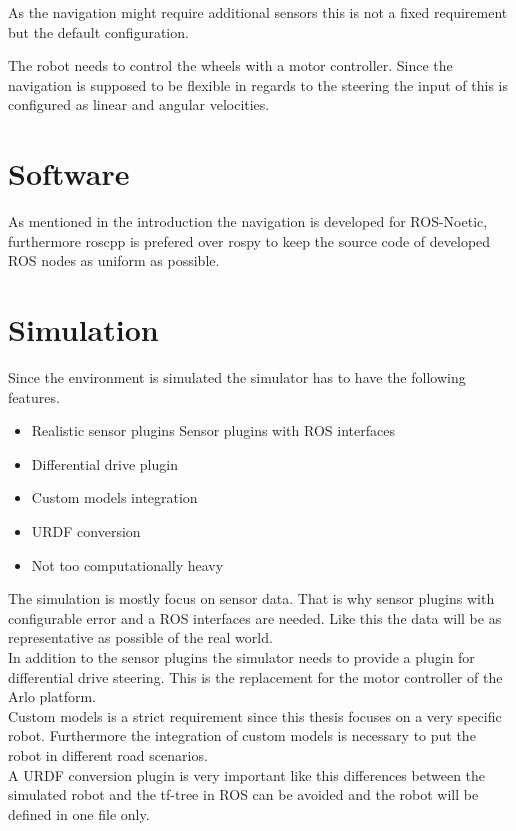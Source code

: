 As the navigation might require additional sensors this is not a fixed requirement but the default configuration.

The robot needs to control the wheels with a motor controller. Since the navigation is supposed to be flexible in regards to the steering the input of this is configured as linear and angular velocities.

\section{Software}
As mentioned in the introduction the navigation is developed for ROS-Noetic, furthermore roscpp is prefered over rospy to keep the source code of developed ROS nodes as uniform as possible.

\section{Simulation}
Since the environment is simulated the simulator has to have the following features.
\begin{itemize}
	\item Realistic sensor plugins Sensor plugins with ROS interfaces
	\item Differential drive plugin
	\item Custom models integration
	\item URDF conversion
	\item Not too computationally heavy
\end{itemize}

The simulation is mostly focus on sensor data. That is why sensor plugins with configurable error and a ROS interfaces are needed. Like this the data will be as representative as possible of the real world.\\

In addition to the sensor plugins the simulator needs to provide a plugin for differential drive steering. This is the replacement for the motor controller of the Arlo platform.\\

Custom models is a strict requirement since this thesis focuses on a very specific robot. Furthermore the integration of custom models is necessary to put the robot in different road scenarios.\\

A URDF conversion plugin is very important like this differences between the simulated robot and the tf-tree in ROS can be avoided and the robot will be defined in one file only.\\

